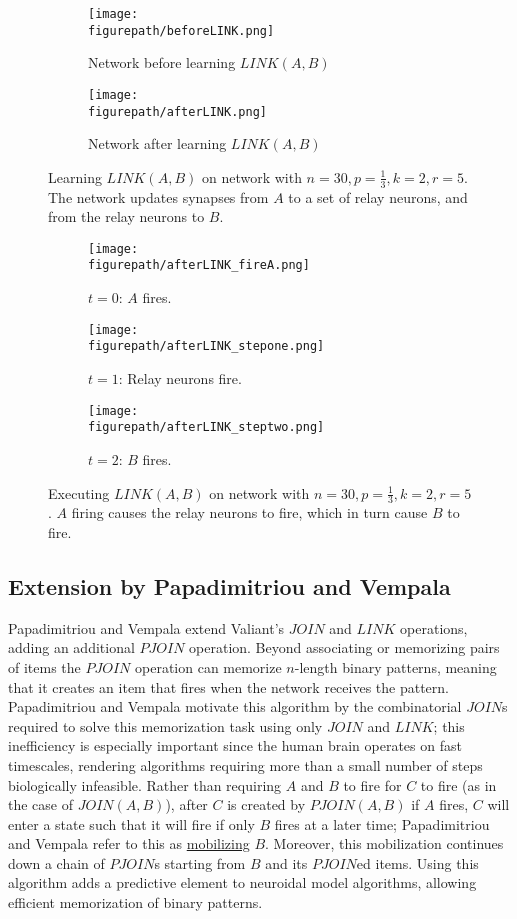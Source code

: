 \documentclass[letterpaper, 12pt]{article}
\newcommand{\figurepath}{../../Figures}
\begin{document}
\begin{figure}[!htb]
\centering
\begin{subfigure}[b]{0.45\textwidth}
      \texttt{[image: \\figurepath/beforeLINK.png]}
      \caption*{Network before learning $LINK(A,B)$}
\end{subfigure}
\begin{subfigure}[b]{0.45\textwidth}
      \texttt{[image: \\figurepath/afterLINK.png]}
      \caption*{Network after learning $LINK(A,B)$}
\end{subfigure}
\caption{Learning $LINK(A,B)$ on network with $n=30,p=\frac{1}{3},k=2,r=5$. The network updates synapses from $A$ to a set of relay neurons, and from the relay neurons to $B$.}
\end{figure}

\begin{figure}[!htb]
\centering
\begin{subfigure}[b]{0.3\textwidth}
      \texttt{[image: \\figurepath/afterLINK\_fireA.png]}
      \caption*{$t=0$: $A$ fires.}
\end{subfigure}
\begin{subfigure}[b]{0.3\textwidth}
      \texttt{[image: \\figurepath/afterLINK\_stepone.png]}
      \caption*{$t=1$: Relay neurons fire.}
\end{subfigure}
\begin{subfigure}[b]{0.3\textwidth}
      \texttt{[image: \\figurepath/afterLINK\_steptwo.png]}
      \caption*{$t=2$: $B$ fires.}
\end{subfigure}
\caption{Executing $LINK(A,B)$ on network with $n=30,p=\frac{1}{3},k=2,r=5$. $A$ firing causes the relay neurons to fire, which in turn cause $B$ to fire.}
\end{figure}

\subsection{Extension by Papadimitriou and Vempala}\label{sec:pjoin}
Papadimitriou and Vempala \cite{papadimitriou_cortical_2015} extend Valiant's $JOIN$ and $LINK$ operations, adding an additional $PJOIN$ operation. Beyond associating or memorizing pairs of items the $PJOIN$ operation can memorize $n$-length binary patterns, meaning that it creates an item that fires when the network receives the pattern. Papadimitriou and Vempala motivate this algorithm by the combinatorial $JOIN$s required to solve this memorization task using only $JOIN$ and $LINK$; this inefficiency is especially important since the human brain operates on fast timescales, rendering algorithms requiring more than a small number of steps biologically infeasible. Rather than requiring $A$ and $B$ to fire for $C$ to fire (as in the case of $JOIN(A, B)$), after $C$ is created by $PJOIN(A,B)$ if $A$ fires, $C$ will enter a state such that it will fire if only $B$ fires at a later time; Papadimitriou and Vempala refer to this as \underline{mobilizing} $B$. Moreover, this mobilization continues down a chain of $PJOIN$s starting from $B$ and its $PJOIN$ed items. Using this algorithm adds a predictive element to neuroidal model algorithms, allowing efficient memorization of binary patterns.
\end{document}
